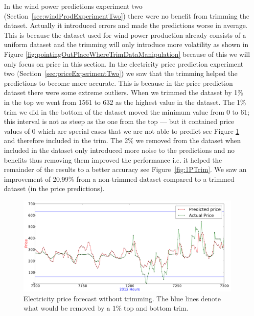 In the wind power predictions experiment two (Section~\ref{sec:windProdExperimentTwo}) there were no benefit from trimming the dataset. Actually it introduced errors and made the predictions worse in average. This is because the dataset used for wind power production already consists of a uniform dataset and the trimming will only introduce more volatility as shown in Figure \ref{fig:pointingOutPlaceWhereTrimDataManipulation} because of this we will only focus on price in this section. In the electricity price prediction experiment two (Section~\ref{sec:priceExperimentTwo}) we saw that the trimming helped the predictions to become more accurate. This is because in the price prediction dataset there were some extreme outliers. When we trimmed the dataset by 1\% in the top we went from 1561 to 632 as the highest value in the dataset. The 1\% trim we did in the bottom of the dataset moved the minimum value from 0 to 61; this interval is not as steep as the one from the top --- but it contained price values of 0 which are special cases that we are not able to predict see Figure \ref{fig:1PTrimBottom} and therefore included in the trim. The 2\% we removed from the dataset when included in the dataset only introduced more noise to the predictions and no benefits thus removing them improved the performance i.e. it helped the remainder of the results to a better accuracy see Figure~\ref{fig:1PTrim}. We saw an improvement of 20,99\% from a non-trimmed dataset compared to a trimmed dataset (in the price predictions).

\begin{figure}[H]
\centering
\includegraphics[width=0.99\linewidth]{billeder/Discussion/1PTrimBottom.png}
\caption{Electricity price forecast without trimming. The blue lines denote what would be removed by a 1\% top and bottom trim.}
\label{fig:1PTrimBottom}
\end{figure}


